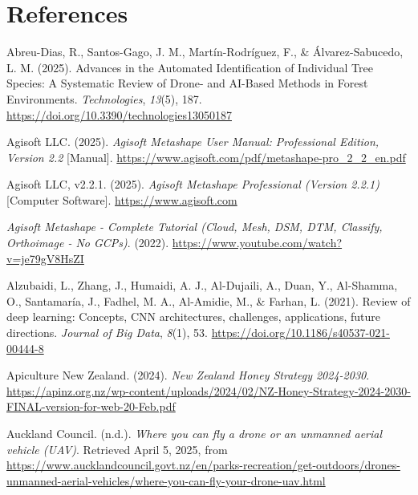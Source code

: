 \documentclass[
]{scrreprt}
\newlength{\cslhangindent}
\newenvironment{CSLReferences}[2] %
 {\begin{list}{}{%
  \setlength{\itemindent}{0pt}
  \setlength{\leftmargin}{0pt}
  \setlength{\parsep}{0pt}
  \setlength{\baselineskip}{12pt}
  \ifodd #1
   \setlength{\leftmargin}{\cslhangindent}
   \setlength{\itemindent}{-1\cslhangindent}
  \fi
  \setlength{\itemsep}{4pt}}}
 {\end{list}}
\begin{document}
\newpage{}

\chapter*{References}\label{references}

\label{refs}
\begin{CSLReferences}{1}{0}
Abreu-Dias, R., Santos-Gago, J. M., Martín-Rodríguez, F., \&
Álvarez-Sabucedo, L. M. (2025). Advances in the {Automated
Identification} of {Individual Tree Species}: {A Systematic Review} of
{Drone-} and {AI-Based Methods} in {Forest Environments}.
\emph{Technologies}, \emph{13}(5), 187.
\url{https://doi.org/10.3390/technologies13050187}

Agisoft LLC. (2025). \emph{Agisoft {Metashape User Manual}:
{Professional Edition}, {Version} 2.2} {[}Manual{]}.
\url{https://www.agisoft.com/pdf/metashape-pro_2_2_en.pdf}

Agisoft LLC, v2.2.1. (2025). \emph{Agisoft {Metashape Professional}
({Version} 2.2.1)} {[}Computer Software{]}.
\url{https://www.agisoft.com}

\emph{Agisoft {Metashape} - {Complete Tutorial} ({Cloud}, {Mesh}, {DSM},
{DTM}, {Classify}, {Orthoimage} - {No GCPs})}. (2022).
\url{https://www.youtube.com/watch?v=je79gV8HsZI}

Alzubaidi, L., Zhang, J., Humaidi, A. J., Al-Dujaili, A., Duan, Y.,
Al-Shamma, O., Santamaría, J., Fadhel, M. A., Al-Amidie, M., \& Farhan,
L. (2021). Review of deep learning: Concepts, {CNN} architectures,
challenges, applications, future directions. \emph{Journal of Big Data},
\emph{8}(1), 53. \url{https://doi.org/10.1186/s40537-021-00444-8}

Apiculture New Zealand. (2024). \emph{New {Zealand Honey Strategy}
2024-2030}.
\url{https://apinz.org.nz/wp-content/uploads/2024/02/NZ-Honey-Strategy-2024-2030-FINAL-version-for-web-20-Feb.pdf}

Auckland Council. (n.d.). \emph{Where you can fly a drone or an unmanned
aerial vehicle ({UAV})}. Retrieved April 5, 2025, from
\url{https://www.aucklandcouncil.govt.nz/en/parks-recreation/get-outdoors/drones-unmanned-aerial-vehicles/where-you-can-fly-your-drone-uav.html}


\end{CSLReferences}
\end{document}
